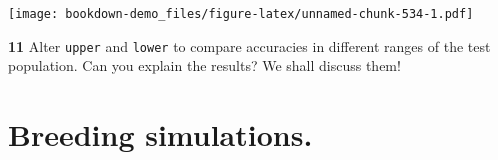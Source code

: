 \documentclass[
]{book}
\makeatletter
\newenvironment{kframe}{%
\medskip{}
\setlength{\fboxsep}{.8em}
 \def\at@end@of@kframe{}%
 \ifinner\ifhmode%
  \def\at@end@of@kframe{\end{minipage}}%
  \begin{minipage}{\columnwidth}%
 \fi\fi%
 \def\FrameCommand##1{\hskip\@totalleftmargin \hskip-\fboxsep
 \colorbox{shadecolor}{##1}\hskip-\fboxsep
     \hskip-\linewidth \hskip-\@totalleftmargin \hskip\columnwidth}%
 \MakeFramed {\advance\hsize-\width
   \@totalleftmargin\z@ \linewidth\hsize
   \@setminipage}}%
 {\par\unskip\endMakeFramed%
 \at@end@of@kframe}
\newenvironment{rmdblock}[1]
  {
  \begin{itemize}
  \renewcommand{\labelitemi}{
    \raisebox{-.7\height}[0pt][0pt]{
      {\setkeys{Gin}{width=3em,keepaspectratio}\texttt{[image: images/\#1]}}
    }
  }
  \setlength{\fboxsep}{1em}
  \begin{kframe}
  \item
  }
  {
  \end{kframe}
  \end{itemize}
  }
\newenvironment{rmdquiz}
  {\begin{rmdblock}{quiz}}
  {\end{rmdblock}}
\makeatother
\begin{document}
\texttt{[image: bookdown-demo\_files/figure-latex/unnamed-chunk-534-1.pdf]}

\begin{rmdquiz}
\textbf{11}
Alter \texttt{upper} and \texttt{lower} to compare accuracies in different ranges of the test population.
Can you explain the results? We shall discuss them!
\end{rmdquiz}

\hypertarget{Breeding-simulations}{%
\chapter{Breeding simulations.}\label{Breeding-simulations}}

\backmatter

  

\printindex
\end{document}
